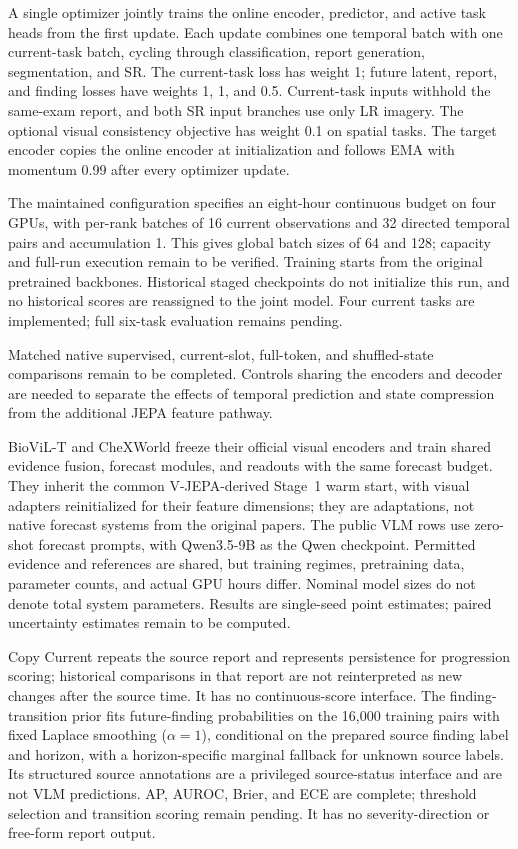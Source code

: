 A single optimizer jointly trains the online encoder, predictor, and active
task heads from the first update. Each update combines one temporal batch with
one current-task batch, cycling through classification, report generation,
segmentation, and SR. The current-task loss has weight 1; future latent,
report, and finding losses have weights 1, 1, and 0.5. Current-task inputs
withhold the same-exam report, and both SR input branches use only LR imagery.
The optional visual consistency objective has weight 0.1 on spatial tasks.
The target encoder copies the online encoder at initialization and follows
EMA with momentum 0.99 after every optimizer update.

The maintained configuration specifies an eight-hour continuous budget on
four GPUs, with per-rank batches of 16 current observations and 32 directed
temporal pairs and accumulation 1. This gives global batch sizes of 64 and
128; capacity and full-run execution remain to be verified. Training starts
from the original pretrained backbones. Historical staged checkpoints do not
initialize this run, and no historical scores are reassigned to the joint
model. Four current tasks are implemented; full six-task evaluation remains
pending.

Matched native supervised, current-slot, full-token, and shuffled-state
comparisons remain to be completed. Controls sharing the encoders and decoder
are needed to separate the effects of temporal prediction and state compression
from the additional JEPA feature pathway.

BioViL-T and CheXWorld freeze their official visual encoders and train shared
evidence fusion, forecast modules, and readouts with the same forecast budget.
They inherit the common V-JEPA-derived Stage~1 warm start, with visual adapters
reinitialized for their feature dimensions; they are adaptations, not native
forecast systems from the original papers. The public VLM rows use zero-shot
forecast prompts, with Qwen3.5-9B as the Qwen checkpoint. Permitted evidence and
references are shared, but training regimes, pretraining data, parameter counts,
and actual GPU hours differ. Nominal model sizes do not denote total system
parameters. Results are single-seed point estimates; paired uncertainty estimates
remain to be computed.

Copy Current repeats the source report and represents persistence for progression
scoring; historical comparisons in that report are not reinterpreted as new
changes after the source time. It has no continuous-score interface. The
finding-transition prior fits future-finding probabilities on the 16,000 training
pairs with fixed Laplace smoothing ($\alpha=1$), conditional on the prepared
source finding label and horizon, with a horizon-specific marginal fallback for
unknown source labels. Its structured source annotations are a privileged
source-status interface and are not VLM predictions. AP, AUROC, Brier, and ECE
are complete; threshold selection and transition scoring remain pending. It has
no severity-direction or free-form report output.

